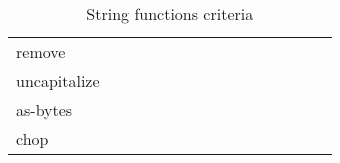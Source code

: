 \documentclass[anonymous,sigplan,review,11pt,nonacm,natbib=false]{acmart}
\begin{document}
\begin{table*}
\begin{tabular}{lllllllllllllll}
            remove &  &  &  &  &  &  &  &  &  &  &  &  &  & \\

            uncapitalize &  &  &  &  &  &  &  &  &  &  &  &  &  & \\

            as-bytes &  &  &  &  &  &  &  &  &  &  &  &  &  & \\

            chop &  &  &  &  &  &  &  &  &  &  &  &  &  & \\ \hline
        \end{tabular}
        \caption{String functions criteria}
        \label{tab:my_label}
    \end{table*}

    \printbibliography
\end{document}
